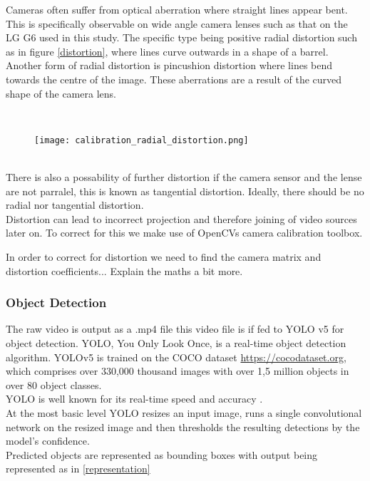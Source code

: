 Cameras often suffer from optical aberration where straight lines appear bent. This is specifically observable on 
wide angle camera lenses such as that on the LG G6 used in this study.
The specific type being positive radial distortion such as in figure \ref{distortion}, where lines curve outwards in a shape of a barrel.
Another form of radial distortion is pincushion distortion where lines bend towards the centre of the image. These aberrations are a result 
of the curved shape of the camera lens.

\ \\ 
\begin{figure}[h]
  \texttt{[image: calibration\_radial\_distortion.png]}
  \centering 
  \end{figure}
  \label{distortion}

\ \\

There is also a possability of further distortion if the camera sensor and the lense are not parralel, this is known as tangential distortion.
Ideally, there should be no radial nor tangential distortion.
\ \\
Distortion can lead to incorrect projection and therefore joining of video sources later on.
To correct for this we make use of OpenCVs \cite{noauthor_opencv/opencv_2021} camera calibration toolbox.

In order to correct for distortion we need to find the camera matrix and distortion coefficients... Explain the maths a bit more.
\ \\
\subsubsection{Object Detection}

The raw video is output as a .mp4 file this video file is if fed to YOLO v5 for object detection. YOLO, You Only Look Once,
is a real-time object detection algorithm. YOLOv5 is trained on the COCO dataset \url{https://cocodataset.org}, which comprises over 330,000 thousand images
with over 1,5 million objects in over 80 object classes.
\ \\ 
YOLO is well known for its real-time speed and accuracy \cite{redmon2016look}.
\ \\ 
At the most basic level YOLO resizes an input image, runs a single convolutional network on the resized image
and then thresholds the resulting detections by the model’s confidence.
\ \\ 
Predicted objects are represented as bounding boxes with output being represented as in \ref{representation} 

